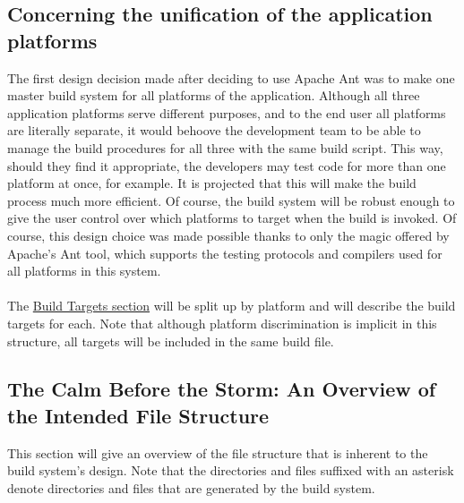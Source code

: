 \documentclass[12pt]{report}
\begin{document}
\subsection{Concerning the unification of the application platforms}
The first design decision made after deciding to use Apache Ant was to make one master build system
for all platforms of the application. Although all three application platforms serve different
purposes, and to the end user all platforms are literally separate, it would behoove the development
team to be able to manage the build procedures for all three with the same build script. This way,
should they find it appropriate, the developers may test code for more than one platform at once,
for example. It is projected that this will make the build process much more efficient. Of course,
the build system will be robust enough to give the user control over which platforms to target when
the build is invoked. Of course, this design choice was made possible thanks to only the magic
offered by Apache's Ant tool, which supports the testing protocols and compilers used for all
platforms in this system.\\\\
The \hyperref[s:build-targets]{Build Targets section} will be split up by platform and will describe
the build targets for each.
Note that although platform discrimination is implicit in this structure, all targets will be
included in the same build file.

\subsection{The Calm Before the Storm: An Overview of the Intended File Structure}
This section will give an overview of the file structure that is inherent to the build system's
design. Note that the directories and files suffixed with an asterisk denote directories and files
that are generated by the build system.\\\\\

\end{document}
